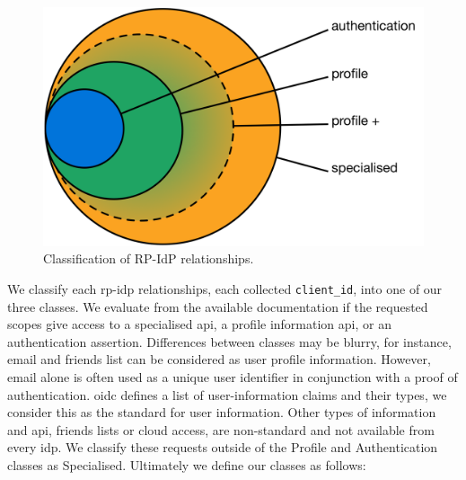 \begin{figure}

\begin{center}
    \includegraphics[scale=0.5]{images/authClasses2}
%
%
%
\caption{Classification of RP-IdP relationships.}
\label{fig_rpclass}
\end{center}
\end{figure}

We classify each \gls{rp}-\gls{idp} relationships, \ie each collected \texttt{client\_id}, into one of our three classes.
We evaluate from the available documentation if the requested scopes give access to a specialised \gls{api}, a profile information \gls{api}, or an authentication assertion.
Differences between classes may be blurry, for instance, email and friends list can be considered as user profile information.
However, email alone is often used as a unique user identifier in conjunction with a proof of authentication.
\gls{oidc} defines a list of user-information claims and their types, we consider this as the standard for user information.
Other types of information and \gls{api}, \eg friends lists or cloud access, are non-standard and not available from every \gls{idp}.
We classify these requests outside of the Profile and Authentication classes as Specialised.
Ultimately we define our classes as follows:


